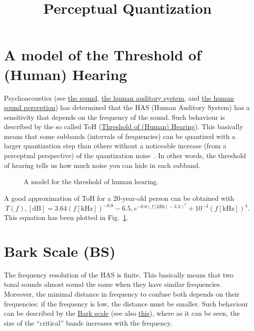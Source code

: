 
\title{Perceptual Quantization}

\maketitle
\tableofcontents

\section{A model of the Threshold of (Human) Hearing}

Psychoacoustics (see
\href{https://vicente-gonzalez-ruiz.github.io/the_sound/}{the sound},
\href{https://vicente-gonzalez-ruiz.github.io/human_auditory_system/}{the
  human auditory system}, and
\href{https://vicente-gonzalez-ruiz.github.io/human_sound_perception/}{the
  human sound perception}) has determined that the HAS (Human Auditory
System) has a sensitivity that depends on the frequency of the
sound. Such behaviour is described by the so called ToH
(\href{https://en.wikipedia.org/wiki/Absolute_threshold_of_hearing}{Threshold
  of (Human) Hearing}). This basically means that some subbands
(intervals of frequencies) can be quantized with a larger quantization
step than others without a noticeable increase (from a perceptual
perspective) of the quantization
noise~\cite{sayood2017introduction}. In other words, the threshold of
hearing tells us how much noise you can hide in each subband.

\begin{figure}
  \centering
  \caption{A model for the threshold of human hearing.}
  \label{fig:ToHH}
\end{figure}

A good approximation of ToH for a 20-year-old person can be
obtained with~\cite{bosi2003intro}
\begin{equation}
T(f),[\text{dB}] = 3.64(f[\text{kHz}])^{-0.8} - 6.5,e^{-0.6(f[\text{kHz}]-3.3)^2} + 10^{-3}(f[\text{kHz}])^4 .
\label{eq:ToHH}
\end{equation}
This equation has been plotted in Fig.~\ref{fig:ToHH}.

\section{Bark Scale (BS)}

The frequency resolution of the HAS is finite. This basically means
that two tonal sounds almost sound the same when they have similar
frequencies. Moreover, the minimal distance in frequency to confuse
both depends on their frequencies: if the frequency is low, the
distance must be smaller. Such behaviour can be described by the
\href{https://en.wikipedia.org/wiki/Bark_scale}{Bark scale} (see also
\href{https://ccrma.stanford.edu/~jos/bbt/Bark_Frequency_Scale.html}{this}),
where as it can be seen, the size of the ``critical'' bands increases
with the frequency.

